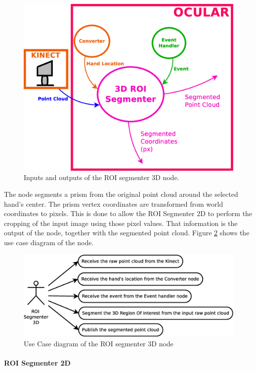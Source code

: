 		\begin{figure}[H]
			\begin{center}
			\includegraphics[width=0.5\linewidth]{img/diagrams/node_roi3d.eps}
			\caption[ROI segmenter 3D node I/O]{Inputs and outputs of the ROI segmenter 3D node.}		
			\label{node_roi3d}
			\end{center}
		\end{figure}


	The node segments a prism from the original point cloud around the selected hand's center. 
	The prism vertex coordinates are transformed from world coordinates to pixels. 
	This is done to allow the ROI Segmenter 2D to perform the cropping of the input image using those pixel values. 
	That information is the output of the node, together with the segmented point cloud. 
	Figure \ref{uc_roi3d} shows the use case diagram of the node. 

	\begin{figure}[H]
		\centering
	\includegraphics[scale=0.4]{img/diagrams/uc_roi_segmenter_3d.eps}
		\caption[Use case diagram ROI segmenter 3D node]{Use Case diagram of the ROI segmenter 3D node}
		\label{uc_roi3d}	
	\end{figure}
 

\paragraph{ROI Segmenter 2D}\mbox{}\\
	\label{roi_segmenter_2d}
	

